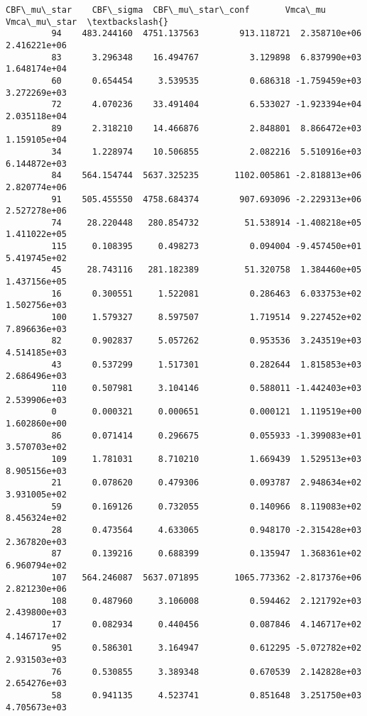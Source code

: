 \documentclass[11pt]{article}
\begin{document}
\begin{Verbatim}[commandchars=\\\{\}]
              CBF\_mu\_star    CBF\_sigma  CBF\_mu\_star\_conf       Vmca\_mu  Vmca\_mu\_star  \textbackslash{}
         94    483.244160  4751.137563        913.118721  2.358710e+06  2.416221e+06   
         83      3.296348    16.494767          3.129898  6.837990e+03  1.648174e+04   
         60      0.654454     3.539535          0.686318 -1.759459e+03  3.272269e+03   
         72      4.070236    33.491404          6.533027 -1.923394e+04  2.035118e+04   
         89      2.318210    14.466876          2.848801  8.866472e+03  1.159105e+04   
         34      1.228974    10.506855          2.082216  5.510916e+03  6.144872e+03   
         84    564.154744  5637.325235       1102.005861 -2.818813e+06  2.820774e+06   
         91    505.455550  4758.684374        907.693096 -2.229313e+06  2.527278e+06   
         74     28.220448   280.854732         51.538914 -1.408218e+05  1.411022e+05   
         115     0.108395     0.498273          0.094004 -9.457450e+01  5.419745e+02   
         45     28.743116   281.182389         51.320758  1.384460e+05  1.437156e+05   
         16      0.300551     1.522081          0.286463  6.033753e+02  1.502756e+03   
         100     1.579327     8.597507          1.719514  9.227452e+02  7.896636e+03   
         82      0.902837     5.057262          0.953536  3.243519e+03  4.514185e+03   
         43      0.537299     1.517301          0.282644  1.815853e+03  2.686496e+03   
         110     0.507981     3.104146          0.588011 -1.442403e+03  2.539906e+03   
         0       0.000321     0.000651          0.000121  1.119519e+00  1.602860e+00   
         86      0.071414     0.296675          0.055933 -1.399083e+01  3.570703e+02   
         109     1.781031     8.710210          1.669439  1.529513e+03  8.905156e+03   
         21      0.078620     0.479306          0.093787  2.948634e+02  3.931005e+02   
         59      0.169126     0.732055          0.140966  8.119083e+02  8.456324e+02   
         28      0.473564     4.633065          0.948170 -2.315428e+03  2.367820e+03   
         87      0.139216     0.688399          0.135947  1.368361e+02  6.960794e+02   
         107   564.246087  5637.071895       1065.773362 -2.817376e+06  2.821230e+06   
         108     0.487960     3.106008          0.594462  2.121792e+03  2.439800e+03   
         17      0.082934     0.440456          0.087846  4.146717e+02  4.146717e+02   
         95      0.586301     3.164947          0.612295 -5.072782e+02  2.931503e+03   
         76      0.530855     3.389348          0.670539  2.142828e+03  2.654276e+03   
         58      0.941135     4.523741          0.851648  3.251750e+03  4.705673e+03   

\end{Verbatim}
\end{document}
